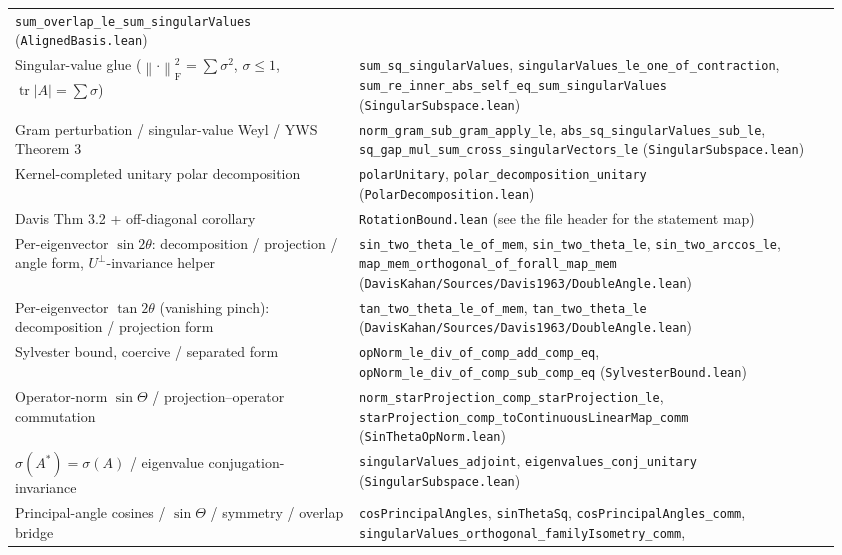 \documentclass[11pt]{article}
\newcommand{\norm}[1]{\left\lVert #1\right\rVert}
\newcommand{\F}{\mathrm{F}}
\DeclareMathOperator{\tr}{tr}
\theoremstyle{remark}
\begin{document}
\begin{center}
\begin{tabular}{@{}p{0.40\linewidth}p{0.56\linewidth}@{}}
    \texttt{sum\_overlap\_le\_sum\_singularValues} (\texttt{AlignedBasis.lean}) \\
Singular-value glue ($\norm{\cdot}_{\F}^2=\sum\sigma^2$, $\sigma\le1$,
$\tr\lvert A\rvert=\sum\sigma$)
  & \texttt{sum\_sq\_singularValues},
    \texttt{singularValues\_le\_one\_of\_contraction},
    \texttt{sum\_re\_inner\_abs\_self\_eq\_sum\_singularValues} (\texttt{SingularSubspace.lean}) \\
Gram perturbation / singular-value Weyl / YWS Theorem 3
  & \texttt{norm\_gram\_sub\_gram\_apply\_le},
    \texttt{abs\_sq\_singularValues\_sub\_le},
    \texttt{sq\_gap\_mul\_sum\_cross\_singularVectors\_le} (\texttt{SingularSubspace.lean}) \\
Kernel-completed unitary polar decomposition
  & \texttt{polarUnitary}, \texttt{polar\_decomposition\_unitary} (\texttt{PolarDecomposition.lean}) \\
Davis Thm 3.2 + off-diagonal corollary
  & \texttt{RotationBound.lean} (see the file header for the statement map) \\
Per-eigenvector $\sin2\theta$: decomposition / projection / angle form,
$U^{\perp}$-invariance helper
  & \texttt{sin\_two\_theta\_le\_of\_mem}, \texttt{sin\_two\_theta\_le},
    \texttt{sin\_two\_arccos\_le},
    \texttt{map\_mem\_orthogonal\_of\_forall\_map\_mem} (\texttt{DavisKahan/Sources/Davis1963/DoubleAngle.lean}) \\
Per-eigenvector $\tan2\theta$ (vanishing pinch): decomposition / projection form
  & \texttt{tan\_two\_theta\_le\_of\_mem}, \texttt{tan\_two\_theta\_le}
    (\texttt{DavisKahan/Sources/Davis1963/DoubleAngle.lean}) \\
Sylvester bound, coercive / separated form
  & \texttt{opNorm\_le\_div\_of\_comp\_add\_comp\_eq},
    \texttt{opNorm\_le\_div\_of\_comp\_sub\_comp\_eq} (\texttt{SylvesterBound.lean}) \\
Operator-norm $\sin\Theta$ / projection--operator commutation
  & \texttt{norm\_starProjection\_comp\_starProjection\_le},
    \texttt{starProjection\_comp\_toContinuousLinearMap\_comm}
    (\texttt{SinThetaOpNorm.lean}) \\
$\sigma(A^{*})=\sigma(A)$ / eigenvalue conjugation-invariance
  & \texttt{singularValues\_adjoint}, \texttt{eigenvalues\_conj\_unitary}
    (\texttt{SingularSubspace.lean}) \\
Principal-angle cosines / $\sin\Theta$ / symmetry / overlap bridge
  & \texttt{cosPrincipalAngles}, \texttt{sinThetaSq},
    \texttt{cosPrincipalAngles\_comm},
    \texttt{singularValues\_orthogonal\_familyIsometry\_comm},

\end{tabular}
\end{center}
\end{document}
